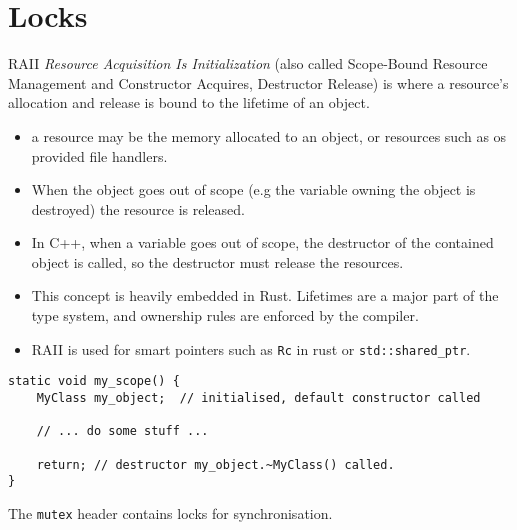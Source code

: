 \section{Locks}
\begin{definitionbox}{RAII}
  \textit{Resource Acquisition Is Initialization} (also called Scope-Bound Resource Management and Constructor Acquires, Destructor Release) is where a resource's allocation and release is bound to the lifetime of an object.
  \begin{itemize}
    \item a resource may be the memory allocated to an object, or resources such as os provided file handlers.
    \item When the object goes out of scope (e.g the variable owning the object is destroyed) the resource is released.
    \item In C++, when a variable goes out of scope, the destructor of the contained object is called, so the destructor must release the resources.
    \item This concept is heavily embedded in Rust. Lifetimes are a major part of the type system, and ownership rules are enforced by the compiler.
    \item RAII is used for smart pointers such as \texttt{Rc} in rust or \texttt{std::shared_ptr}.
  \end{itemize}
  \begin{verbatim}
static void my_scope() {
    MyClass my_object;  // initialised, default constructor called

    // ... do some stuff ...

    return; // destructor my_object.~MyClass() called. 
}
  \end{verbatim}
\end{definitionbox}
The \texttt{mutex} header contains locks for synchronisation.
